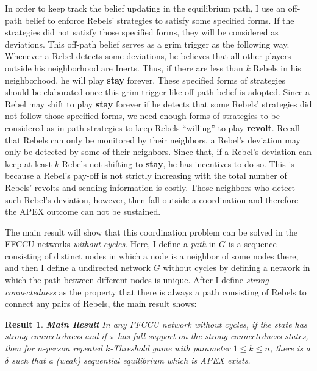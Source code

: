 \documentclass[12pt,letter]{article}
\newtheorem{result}{Result}
\theoremstyle{definition}
\theoremstyle{remark}
\theoremstyle{claim}
\begin{document}
In order to keep track the belief updating in the equilibrium path, I use an off-path belief to enforce Rebels' strategies to satisfy some specified forms. If the strategies did not satisfy those specified forms, they will be considered as deviations. This off-path belief serves as a grim trigger as the following way. Whenever a Rebel detects some deviations, he believes that all other players outside his neighborhood are Inerts. Thus, if there are less than $k$ Rebels in his neighborhood, he will play \textbf{stay} forever. These specified forms of strategies should be elaborated once this grim-trigger-like off-path belief is adopted. Since a Rebel may shift to play \textbf{stay} forever if he detects that some Rebels' strategies did not follow those specified forms,  we need enough forms of strategies to be considered as in-path strategies to keep Rebels ``willing'' to play \textbf{revolt}. Recall that Rebels can only be monitored by their neighbors, a Rebel's deviation may only be detected by some of their neighbors. Since that, if a Rebel's deviation can keep at least $k$ Rebels not shifting to \textbf{stay}, he has incentives to do so. This is because a Rebel's pay-off is not strictly increasing with the total number of Rebels' revolts and sending information is costly. Those neighbors who detect such Rebel's deviation, however, then fall outside a coordination and therefore the APEX outcome can not be sustained.



The main result will show that this coordination problem can be solved in the FFCCU networks \textit{without cycles}. Here, I define a \textit{path} in $G$ is a sequence consisting of distinct nodes in which a node is a neighbor of some nodes there, and then I define a undirected network $G$ without cycles by defining a network in which the path between different nodes is unique. After I define \textit{strong connectedness} as the property that there is always a path consisting of Rebels to connect any pairs of Rebels,  the main result shows:

\begin{result}\textbf{Main Result}
In any FFCCU network without cycles, if the state has strong connectedness and if $\pi$ has full support on the strong connectedness states, then for $n$-person repeated $k$-Threshold game with parameter $1\leq k \leq n$, there is a $\delta$ such that a (weak) sequential equilibrium which is APEX exists.  
\end{result}
\end{document}
